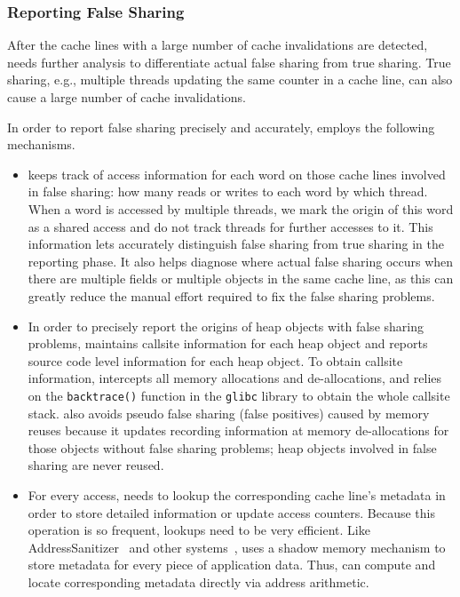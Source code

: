 \subsubsection{Reporting False Sharing}

After the cache lines with a large number of cache invalidations are detected,
\Predator{} needs further analysis to differentiate actual false sharing from true sharing. 
True sharing, e.g., multiple threads updating the same counter in a cache line, can also cause a large number of cache invalidations.

In order to report false sharing precisely and accurately,  
\Predator{} employs the following mechanisms. 

\begin{itemize}
\item

\Predator{} keeps track of access information for each word on those cache lines involved in false sharing: how many reads or writes to each word by which thread.  When a word is accessed by multiple threads, we mark the origin of this word as a shared access and do not track threads for further accesses to it. This information lets \Predator{} accurately distinguish false sharing from true sharing in the reporting phase.  It also helps diagnose where
actual false sharing occurs when there are multiple fields or multiple
objects in the same cache line, as this can greatly reduce the manual
effort required to fix the false sharing problems.

\item
In order to precisely report the origins of heap objects with false
sharing problems, \Predator{} maintains callsite information for each heap
object and reports source code level information for each heap
object. To obtain callsite information, \Predator{} intercepts all memory allocations and de-allocations, and relies
on the \texttt{backtrace()} function in the \texttt{glibc} library to obtain the whole callsite stack.
\Predator{} also avoids pseudo false sharing (false positives) caused by memory reuses because it updates recording information at memory de-allocations for those objects without false sharing problems; heap objects involved in false 
sharing are never reused.


\item
For every access, \Predator{} needs to lookup the corresponding cache line's metadata 
in order to store detailed information or update access counters. Because this operation is so frequent,
 lookups need to be very efficient.
Like 
AddressSanitizer~\cite{AddressSanitizer} and other systems~\cite{qinzhao,Valgrind},
\Predator{} uses a shadow memory mechanism to store metadata for every piece of application data. 
Thus, \Predator{} can compute and locate corresponding metadata directly via address arithmetic.


\end{itemize}
